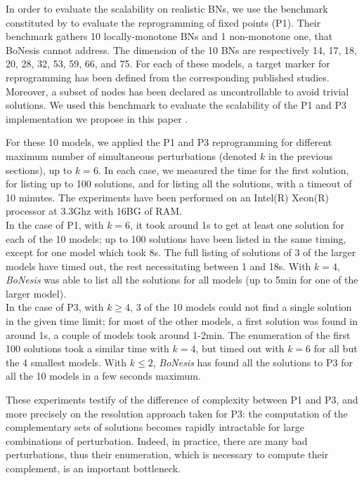 \documentclass[PCJ,Unicode,screen,mode=plain]{cedram}
\begin{document}
In order to evaluate the scalability on realistic BNs, we use the
benchmark constituted by \citet{Moon22} to evaluate the reprogramming of
fixed points (P1). Their benchmark gathers 10 locally-monotone BNs and 1
non-monotone one, that BoNesis cannot address. The dimension of the 10
BNs are respectively 14, 17, 18, 20, 28, 32, 53, 59, 66, and 75. For
each of these models, a target marker for reprogramming has been defined
from the corresponding published studies. Moreover, a subset of nodes
has been declared as uncontrollable to avoid trivial solutions. We used
this benchmark to evaluate the scalability of the P1 and P3
implementation we propose in this paper \citep{SuppMat}.

For these 10 models, we applied the P1 and P3 reprogramming for
different maximum number of simultaneous perturbations (denoted \(k\) in
the previous sections), up to \(k=6\). In each case, we measured the
time for the first solution, for listing up to 100 solutions, and for
listing all the solutions, with a timeout of 10 minutes. The experiments
have been performed on an Intel(R) Xeon(R) processor at 3.3Ghz with 16BG
of RAM.\\
In the case of P1, with \(k=6\), it took around 1s to get at least one
solution for each of the 10 models; up to 100 solutions have been listed
in the same timing, except for one model which took 8s. The full listing
of solutions of 3 of the larger models have timed out, the rest
necessitating between 1 and 18s. With \(k=4\), \emph{BoNesis} was able
to list all the solutions for all models (up to 5min for one of the
larger model).\\
In the case of P3, with \(k\geq 4\), 3 of the 10 models could not find a
single solution in the given time limit; for most of the other models, a
first solution was found in around 1s, a couple of models took around
1-2min. The enumeration of the first 100 solutions took a similar time
with \(k=4\), but timed out with \(k=6\) for all but the 4 smallest
models. With \(k\leq 2\), \emph{BoNesis} has found all the solutions to
P3 for all the 10 models in a few seconds maximum.

These experiments testify of the difference of complexity between P1 and
P3, and more precisely on the resolution approach taken for P3: the
computation of the complementary sets of solutions becomes rapidly
intractable for large combinations of perturbation. Indeed, in practice,
there are many bad perturbations, thus their enumeration, which is
necessary to compute their complement, is an important bottleneck.
\end{document}
